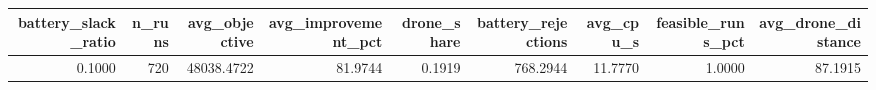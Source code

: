 \begin{tabular}{rrrrrrrrr}
\toprule
battery_slack_ratio & n_runs & avg_objective & avg_improvement_pct & drone_share & battery_rejections & avg_cpu_s & feasible_runs_pct & avg_drone_distance \\
\midrule
0.1000 & 720 & 48038.4722 & 81.9744 & 0.1919 & 768.2944 & 11.7770 & 1.0000 & 87.1915 \\
\bottomrule
\end{tabular}
